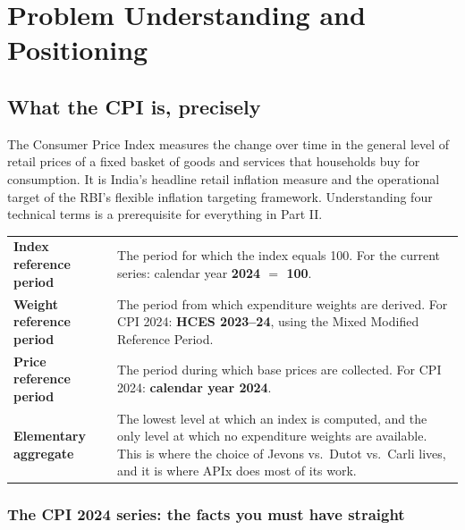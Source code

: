 \chapter{Problem Understanding and Positioning}

\section{What the CPI is, precisely}

The Consumer Price Index measures the change over time in the general level of retail
prices of a fixed basket of goods and services that households buy for consumption. It is
India's headline retail inflation measure and the operational target of the RBI's flexible
inflation targeting framework. Understanding four technical terms is a prerequisite for
everything in Part II.

\begin{center}
\small
\begin{tabularx}{\textwidth}{@{}L{4.2cm} X@{}}
\toprule
{} &  \\
\midrule
\textbf{Index reference period} & The period for which the index equals 100. For the
current series: calendar year \textbf{2024 $=$ 100}. \\
\addlinespace[2pt]
\textbf{Weight reference period} & The period from which expenditure weights are derived.
For CPI 2024: \textbf{HCES 2023--24}, using the Mixed Modified Reference Period. \\
\addlinespace[2pt]
\textbf{Price reference period} & The period during which base prices are collected.
For CPI 2024: \textbf{calendar year 2024}. \\
\addlinespace[2pt]
\textbf{Elementary aggregate} & The lowest level at which an index is computed, and the
only level at which no expenditure weights are available. This is where the choice of
Jevons vs.\ Dutot vs.\ Carli lives, and it is where APIx does most of its work. \\
\bottomrule
\end{tabularx}
\end{center}

\subsection{The CPI 2024 series: the facts you must have straight}

